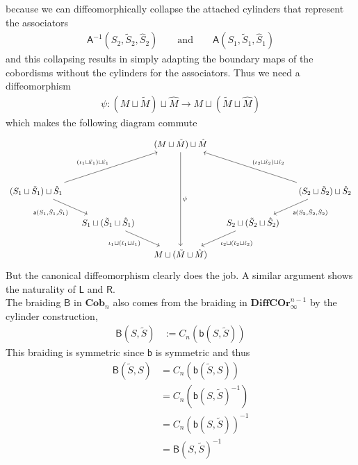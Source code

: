 because we can diffeomorphically collapse the attached cylinders that represent the associators
\begin{align*}
  \mathsf{A}^{-1}(S_{2},\tilde{S}_{2},\hat{S}_{2})
  \qquad
  \text{and}
  \qquad
  \mathsf{A}(S_{1},\tilde{S}_{1},\hat{S}_{1})
\end{align*}
and this collapsing results in simply adapting the boundary maps of the cobordisms without the cylinders for the associators. Thus we need a diffeomorphism
\begin{align*}
  \psi
  \colon
  (M \sqcup \tilde{M})
  \sqcup
  \hat{M}
  \to
  M
  \sqcup
  (\tilde{M} \sqcup \hat{M})
\end{align*}
which makes the following diagram commute
\begin{equation*}
\begin{tikzcd}[column sep=1.4em]
  &
  &
  (M \sqcup \tilde{M}) \sqcup \hat{M}
  \ar{dddd}{\psi}
  &
  &
  \\
  \\
  (S_{1} \sqcup \tilde{S}_{1}) \sqcup \hat{S}_{1}
  \ar{uurr}{(\iota_{1} \sqcup \tilde{\iota}_{1}) \sqcup \hat{\iota}_{1}}
  \ar{dr}[swap]{\mathsf{a}(S_{1},\tilde{S}_{1},\hat{S}_{1})}
  &
  &
  &
  &
  (S_{2} \sqcup \tilde{S}_{2}) \sqcup \hat{S}_{2}
  \ar{uull}[swap]{(\iota_{2} \sqcup \tilde{\iota}_{2}) \sqcup \hat{\iota}_{2}}
  \ar{dl}{\mathsf{a}(S_{2},\tilde{S}_{2},\hat{S}_{2})}
  \\
  &
  S_{1} \sqcup (\tilde{S}_{1} \sqcup \hat{S}_{1})
  \ar{dr}[swap]{\iota_{1} \sqcup (\tilde{\iota}_{1} \sqcup \hat{\iota}_{1})}
  &
  &
  S_{2} \sqcup (\tilde{S}_{2} \sqcup \hat{S}_{2})
  \ar{dl}{\iota_{2} \sqcup (\tilde{\iota}_{2} \sqcup \hat{\iota}_{2})}
  &
  \\
  &
  &
  M \sqcup (\tilde{M} \sqcup \hat{M})
  &
  &
\end{tikzcd}
\end{equation*}
But the canonical diffeomorphism clearly does the job. A similar argument shows the naturality of $\mathsf{L}$ and $\mathsf{R}$.
\\
The braiding $\mathsf{B}$ in $\mathbf{Cob}_{n}$ also comes from the braiding in $\mathbf{DiffCOr}_{\infty}^{n - 1}$ by the cylinder construction,
\begin{align*}
  \mathsf{B}(S,\tilde{S})
  &:=
  C_{n}(\mathsf{b}(S,\tilde{S}))
\end{align*}
This braiding is symmetric since $\mathsf{b}$ is symmetric and thus
\begin{align*}
  \mathsf{B}(\tilde{S},S)
  &=
  C_{n}(\mathsf{b}(\tilde{S},S))
  \\
  &=
  C_{n}(\mathsf{b}(S,\tilde{S})^{-1})
  \\
  &=
  C_{n}(\mathsf{b}(S,\tilde{S}))^{-1}
  \\
  &=
  \mathsf{B}(S,\tilde{S})^{-1}
\end{align*}
